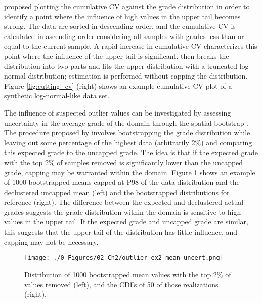 \cite{parker1991statistical} proposed plotting the cumulative \gls{CV} against the grade distribution in order to identify a point where the influence of high values in the upper tail becomes strong. The data are sorted in descending order, and the cumulative \gls{CV} is calculated in ascending order considering all samples with grades less than or equal to the current sample. A rapid increase in cumulative \gls{CV} characterizes this point where the influence of the upper tail is significant. \cite{parker1991statistical} then breaks the distribution into two parts and fits the upper distribution with a truncated log-normal distribution; estimation is performed without capping the distribution. Figure \ref{fig:cutting_cv} (right) shows an example cumulative \gls{CV} plot of a synthetic log-normal-like data set.


The influence of suspected outlier values can be investigated by assessing uncertainty in the average grade of the domain through the spatial bootstrap \citep{solow1985bootstrapping}. The procedure proposed by \cite{nowak2013suggestions} involves bootstrapping the grade distribution while leaving out some percentage of the highest data (arbitrarily 2\%) and comparing this expected grade to the uncapped grade. The idea is that if the expected grade with the top 2\% of samples removed is significantly lower than the uncapped grade, capping may be warranted within the domain. Figure \ref{fig:outlier_ex2_mean_uncert} shows an example of 1000 bootstrapped means capped at P98 of the data distribution and the declustered uncapped mean (left) and the bootstrapped distributions for reference (right). The difference between the expected and declustered actual grades suggests the grade distribution within the domain is sensitive to high values in the upper tail. If the expected grade and uncapped grade are similar, this suggests that the upper tail of the distribution has little influence, and capping may not be necessary.


\begin{figure}[htb!]
    \centering
    \texttt{[image: ./0-Figures/02-Ch2/outlier\_ex2\_mean\_uncert.png]}
    \caption{Distribution of 1000 bootstrapped mean values with the top 2\% of values removed (left), and the \glspl{CDF} of 50 of those realizations (right). }
    \label{fig:outlier_ex2_mean_uncert}
\end{figure}

